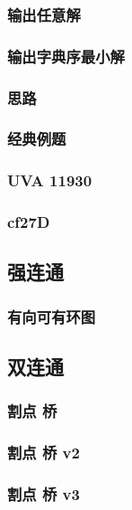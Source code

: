 \documentclass[10pt,a4paper]{article}
\begin{document}
\subsubsection{输出任意解}

\subsubsection{输出字典序最小解}

\subsubsection{思路}

\subsubsection{经典例题}

\subsubsection{UVA 11930}

\subsubsection{cf27D}

\subsection{强连通}
\subsubsection{有向可有环图}

\subsection{双连通}
\subsubsection{割点 桥}

\subsubsection{割点 桥 v2}

\subsubsection{割点 桥 v3}

\end{document}
